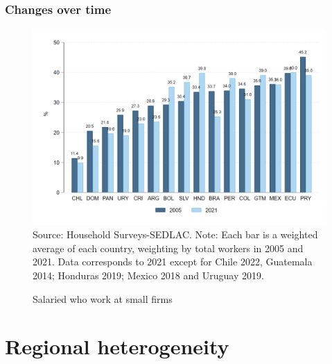 \documentclass{beamer}
\begin{document}

\begin{frame}
\frametitle{Changes over time}
\begin{figure}[!htb]
    \justifying
     \caption{Salaried who work at small firms}     
     \includegraphics[width=0.5\linewidth]{latex/figures/Snapshot/snapshot_dependents_small.png}
    \label{fig:SalariedSmall}
    \footnotesize{Source: Household Surveys-SEDLAC.}
    \footnotesize{Note: Each bar is a weighted average of each country, weighting by total workers in 2005 and 2021.  Data corresponds to 2021 except for Chile 2022, Guatemala 2014; Honduras 2019; Mexico 2018 and Uruguay 2019.}
\end{figure}
\end{frame}


\section{Regional heterogeneity}

\end{document}
